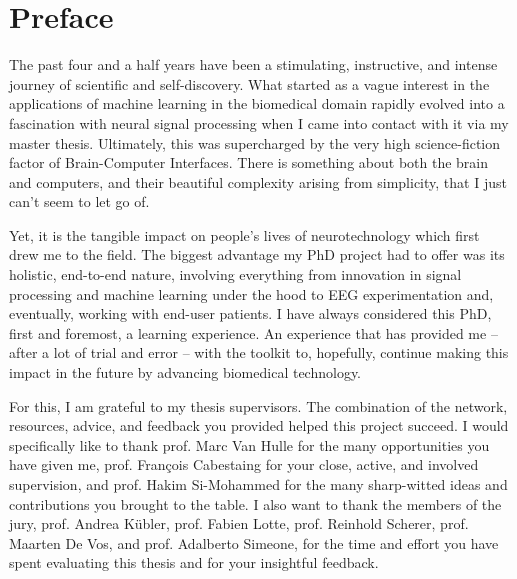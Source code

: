 \chapter*{Preface}

The past four and a half years have been a stimulating, instructive, and intense
journey of scientific and self-discovery. What started as a vague interest
in the applications of machine learning in the biomedical domain rapidly evolved
into a fascination with neural signal processing when I came into contact with
it via my master thesis.
Ultimately, this was supercharged by the very high science-fiction factor
of Brain-Computer Interfaces.
There is something about both the brain and computers, and
their beautiful complexity arising from simplicity, that I just can't
seem to let go of.

Yet, it is the tangible impact on people's lives of neurotechnology
which first drew me to the field.
The biggest advantage my PhD project had to offer was
its holistic, end-to-end nature, involving everything from innovation in signal
processing and machine learning under the hood to EEG
experimentation and, eventually, working with end-user patients. I have
always considered this PhD, first and foremost, a learning experience.
An experience that has provided me -- after a lot of trial and error -- with the
toolkit to, hopefully, continue making this impact in the future by
advancing biomedical technology.

For this, I am grateful to my thesis supervisors. The combination of the
network, resources, advice, and feedback you provided helped this project
succeed.
I would specifically like to thank prof. Marc Van Hulle for the many
opportunities you have given me, prof. François Cabestaing for your close,
active, and involved supervision, and prof. Hakim Si-Mohammed for the many
sharp-witted ideas and contributions you brought to the table.
I also want to thank the members of the jury, prof. Andrea Kübler, prof.
Fabien Lotte, prof. Reinhold Scherer, prof. Maarten De Vos, and prof.
Adalberto Simeone, for the time and effort you have spent evaluating
this thesis and for your insightful feedback.

